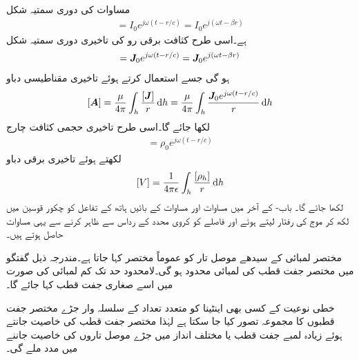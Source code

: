 مساوات  کی دوری سمتیہ شکل
\begin{align}
[I]=I_0 e^{j \omega (t-r/c)}=I_0 e^{j(\omega t-\beta r)}
\end{align}
ہے۔اسی طرح کثافت برقی رو کی تاخیری دوری سمتیہ شکل
\begin{align}
[\kvec{J}]=\kvec{J}_0 e^{j \omega (t-r/c)}=\kvec{J}_0 e^{j(\omega  t -\beta r)}
\end{align}
ہو گی جسے استعمال کرتے ہوئے تاخیری مقناطیسی دباو
\begin{align}\label{مساوات_اینٹینا_تاخیری_سمتی_دباو}
[\kvec{A}]=\frac{\mu}{4\pi}\int_h \frac{[\kvec{J}]}{r}\dif h=\frac{\mu}{4\pi}\int_h \frac{\kvec{J}_0 e^{j\omega(t-r/c)}}{r} \dif h
\end{align}
لکھا جائے گا۔اسی طرح تاخیری حجمی کثافت چارج
\begin{align}
[\rho_h]= \rho_0 e^{j\omega \left(t-r/c \right)}
\end{align}
لکھتے ہوئے تاخیری برقی دباو
\begin{align}\label{مساوات_اینٹینا_تاخیری_مقداری_دباو}
[V]=\frac{1}{4\pi \epsilon}\int_h \frac{[\rho_h]}{ r} \dif h
\end{align}
لکھا جائے گا۔ باب- کے آخر میں مساوات  اور مساوات  کے بائیں ہاتھ کے تفاعل کو چکور قوسین میں لکھ کر موج کی رفتار  لیتے ہوئے اور فاصلے  کو کروی محدد کے رداس  سے ظاہر کرنے سے  یہی مساوات حاصل ہوتے ہیں۔


مختصر لمبائی کے سیدھے موصل تار کو عموماً مختصر  کہا جاتا ہے۔مندرجہ ذیل گفتگو میں مختصر جفت قطب کی لمبائی محدود ہو گی۔لامحدود حد تک کم لمبائی کی صورت میں اسے صغاری جفت قطب کہا جائے گا۔

خطی نوعیت کے کسی بھی اینٹینا کو متعدد تعداد کے سلسلہ وار جڑے مختصر جفت قطبوں کا مجموعہ تصور کیا جا سکتا ہے لہٰذا مختصر جفت قطب کی خاصیت جانتے ہوئے زیادہ لمبے جفت قطب یا مختلف انداز میں جڑے موصل  تاروں کی خاصیت جاننے میں مدد ملے گی۔ 

